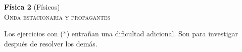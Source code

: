 \documentclass[11pt,spanish,a4paper]{article}
\begin{document}
\begin{center}
\textbf{Física 2} (Físicos) \hfill {}\\
	\textsc{\LARGE Onda estacionaria y propagantes}
\end{center}


Los ejercicios con (*) entrañan una dificultad adicional. Son para investigar después de resolver los demás.



\begin{enumerate}


}




\end{enumerate}
\end{document}
